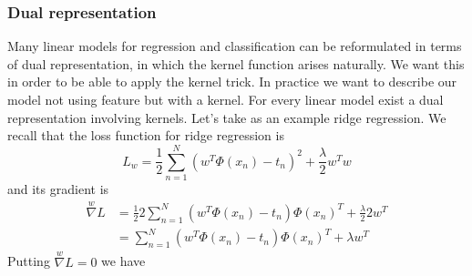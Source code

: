 \documentclass[main.tex]{subfiles}
\begin{document}
\subsubsection{Dual representation}
Many linear models for regression and classification can be reformulated in terms of dual representation, in which the kernel function arises naturally. We want this in order to be able to apply the kernel trick. In practice we want to describe our model not using feature but with a kernel. For every linear model exist a dual representation involving kernels. Let's take as an example ridge regression.
We recall that the loss function for ridge regression is
\begin{equation*}
    L_w = \frac{1}{2}\sum_{n=1}^N (w^T\Phi(x_n) - t_n)^2 + \frac{\lambda}{2}w^T w
\end{equation*}
and its gradient is
\begin{align*}
    \overset{w}{\nabla}L & = \frac{1}{2} 2 \sum_{n=1}^N (w^T\Phi(x_n) - t_n) \Phi(x_n)^T + \frac{\lambda}{2}2 w^T \\
                         & = \sum_{n=1}^N (w^T\Phi(x_n) - t_n) \Phi(x_n)^T + \lambda w^T
\end{align*}
Putting $\overset{w}{\nabla}L = 0$ we have
\end{document}
